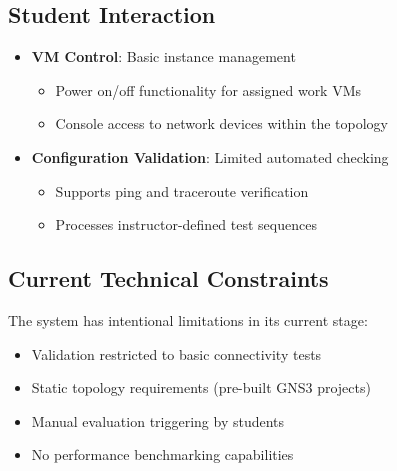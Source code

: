 \subsection{Student Interaction}
\begin{itemize}
    \item \textbf{VM Control}: Basic instance management
    \begin{itemize}
        \item Power on/off functionality for assigned work VMs
        \item Console access to network devices within the topology
    \end{itemize}
    \item \textbf{Configuration Validation}: Limited automated checking
    \begin{itemize}
        \item Supports ping and traceroute verification
        \item Processes instructor-defined test sequences
    \end{itemize}
\end{itemize}

\subsection{Current Technical Constraints}
The system has intentional limitations in its current stage:
\begin{itemize}
    \item Validation restricted to basic connectivity tests
    \item Static topology requirements (pre-built GNS3 projects)
    \item Manual evaluation triggering by students
    \item No performance benchmarking capabilities
\end{itemize}

